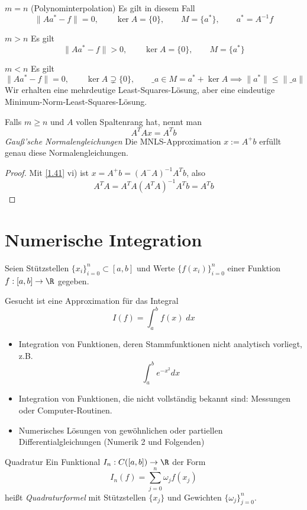 \documentclass[a4paper,11pt]{scrartcl}
\begin{document}
\begin{seg}{$m=n$ (Polynominterpolation)}
	Es gilt in diesem Fall
	\[
		\|Aa^*-f\| = 0, \qquad \ker A = \{0\}, \qquad M = \{a^*\}, \qquad a^* = A^{-1}f
	\]
\end{seg}
\begin{seg}{$m>n$}
	Es gilt
	\[
		\|Aa^*-f\| > 0, \qquad \ker A = \{0\}, \qquad M = \{a^*\}
	\]
\end{seg}
\begin{seg}{$m<n$}
	Es gilt
	\[
		\|Aa^*-f\| = 0, \qquad \ker A \supsetneq \{0\}, \qquad \_a \in M = a^* + \ker A \implies \|a^*\| \le \|\_a\|
	\]
	Wir erhalten eine mehrdeutige Least-Squares-Lösung, aber eine eindeutige Minimum-Norm-Least-Squares-Lösung.
\end{seg}
\begin{nt*}
	Falls $m\ge n$ und $A$ vollen Spaltenrang hat, nennt man
	\[
		A^TAx = A^Tb
	\]
	\emph{Gauß'sche Normalengleichungen}
	Die MNLS-Approximation $x:=A^+b$ erfüllt genau diese Normalengleichungen.
	\begin{proof}
		Mit \ref{1.41} vi) ist $x=A^+b = (A^-A)^{-1}A^Tb$, also
		\[
			A^TA = A^TA(A^TA)^{-1}A^T b = A^Tb
		\]
	\end{proof}
\end{nt*}



\section{Numerische Integration}	



Seien Stützstellen $\{x_i\}_{i=0}^n \subset [a,b]$ und Werte $\{f(x_i)\}_{i=0}^n$ einer Funktion $f:[a,b]\to \R$ gegeben.

Gesucht ist eine Approximation für das Integral
\[
	I(f) = \int_a^b f(x) \;dx
\]
\begin{itemize}
	\item
		Integration von Funktionen, deren Stammfunktionen nicht analytisch vorliegt, z.B.
		\[
			\int_a^b e^{-x^2} dx
		\]
	\item
		Integration von Funktionen, die nicht vollständig bekannt sind: Messungen oder Computer-Routinen.
	\item
		Numerisches Lösungen von gewöhnlichen oder partiellen Differentialgleichungen (Numerik 2 und Folgenden)
\end{itemize}

\begin{df*}{Quadratur}
	Ein Funktional $I_n : C([a,b]) \to \R$ der Form
	\[
		I_n(f) = \sum_{j=0}^n \omega_j f(x_j)
	\]
	heißt \emph{Quadraturformel} mit Stützstellen $\{x_j\}$ und Gewichten $\{\omega_j\}_{j=0}^n$.
\end{df*}
\end{document}
